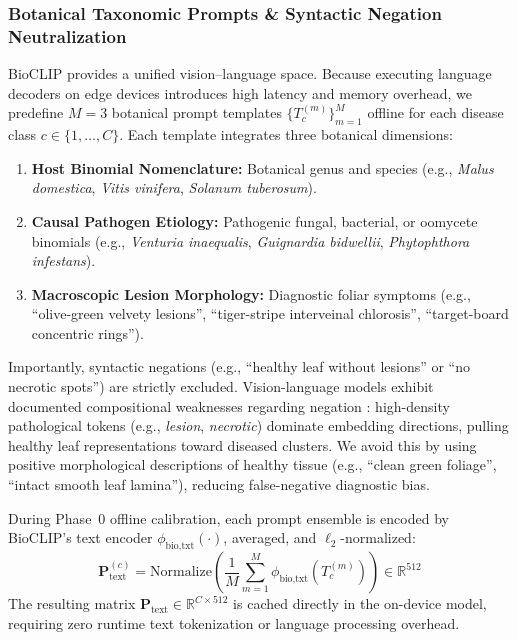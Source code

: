\documentclass[preprint,12pt]{elsarticle}
\begin{document}
\subsubsection{Botanical Taxonomic Prompts \& Syntactic Negation Neutralization}
BioCLIP provides a unified vision--language space. Because executing language decoders on edge devices introduces high latency and memory overhead, we predefine $M=3$ botanical prompt templates $\{T_c^{(m)}\}_{m=1}^M$ offline for each disease class $c \in \{1, \dots, C\}$. Each template integrates three botanical dimensions:
\begin{enumerate}
    \item \textbf{Host Binomial Nomenclature:} Botanical genus and species (e.g., \textit{Malus domestica}, \textit{Vitis vinifera}, \textit{Solanum tuberosum}).
    \item \textbf{Causal Pathogen Etiology:} Pathogenic fungal, bacterial, or oomycete binomials (e.g., \textit{Venturia inaequalis}, \textit{Guignardia bidwellii}, \textit{Phytophthora infestans}).
    \item \textbf{Macroscopic Lesion Morphology:} Diagnostic foliar symptoms (e.g., ``olive-green velvety lesions'', ``tiger-stripe interveinal chlorosis'', ``target-board concentric rings'').
\end{enumerate}

Importantly, syntactic negations (e.g., ``healthy leaf without lesions'' or ``no necrotic spots'') are strictly excluded. Vision-language models exhibit documented compositional weaknesses regarding negation \cite{radford2021clip, yuksekgonul2023when, alhamoud2025vision}: high-density pathological tokens (e.g., \textit{lesion}, \textit{necrotic}) dominate embedding directions, pulling healthy leaf representations toward diseased clusters. We avoid this by using positive morphological descriptions of healthy tissue (e.g., ``clean green foliage'', ``intact smooth leaf lamina''), reducing false-negative diagnostic bias.

During Phase~0 offline calibration, each prompt ensemble is encoded by BioCLIP's text encoder $\phi_{\text{bio,txt}}(\cdot)$, averaged, and $\ell_2$-normalized:
\begin{equation}
    \mathbf{P}_{\text{text}}^{(c)} = \text{Normalize}\left(\frac{1}{M}\sum_{m=1}^M \phi_{\text{bio,txt}}(T_c^{(m)})\right) \in \mathbb{R}^{512}
\end{equation}
The resulting matrix $\mathbf{P}_{\text{text}} \in \mathbb{R}^{C \times 512}$ is cached directly in the on-device model, requiring zero runtime text tokenization or language processing overhead.
\end{document}
